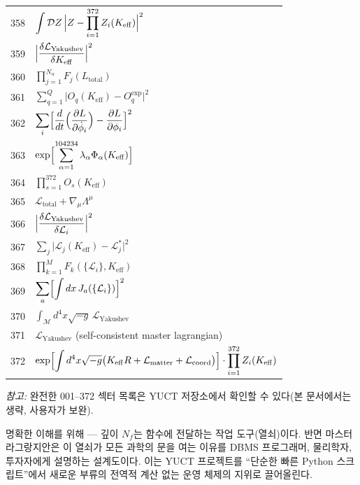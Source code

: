 \documentclass[11pt,a4paper]{article}
\begin{document}
\begin{longtable}{r p{}}
	358 & \(\displaystyle \int\mathcal{D}Z\,\Bigl|Z - \prod_{i=1}^{372}Z_i(K_{\mathrm{eff}})\Bigr|^2\) \\
	359 & \(\displaystyle \Bigl|\frac{\delta\mathcal{L}_{\text{Yakushev}}}{\delta K_{\mathrm{eff}}}\Bigr|^2\) \\
	360 & \(\displaystyle \prod_{j=1}^{N_\alpha}F_j(L_{\text{total}})\) \\
	361 & \(\displaystyle \sum_{q=1}^Q\bigl|O_q(K_{\mathrm{eff}}) - O_q^{\text{exp}}\bigr|^2\) \\
	362 & \(\displaystyle \sum_i\Bigl[\frac{d}{dt}\Bigl(\frac{\partial L}{\partial\dot\phi_i}\Bigr) - \frac{\partial L}{\partial\phi_i}\Bigr]^2\) \\
	363 & \(\displaystyle \exp\Bigl[\sum_{\alpha=1}^{104234}\lambda_\alpha\Phi_\alpha(K_{\mathrm{eff}})\Bigr]\) \\
	364 & \(\displaystyle \prod_{s=1}^{372}O_s(K_{\mathrm{eff}})\) \\
	365 & \(\displaystyle \mathcal{L}_{\text{total}} + \nabla_\mu\Lambda^\mu\) \\
	366 & \(\displaystyle \Bigl|\frac{\delta\mathcal{L}_{\text{Yakushev}}}{\delta\mathcal{L}_i}\Bigr|^2\) \\
	367 & \(\displaystyle \sum_j\bigl|\mathcal{L}_j(K_{\mathrm{eff}}) - \mathcal{L}_j^*\bigr|^2\) \\
	368 & \(\displaystyle \prod_{k=1}^M F_k(\{\mathcal{L}_i\},K_{\mathrm{eff}})\) \\
	369 & \(\displaystyle \sum_a\Bigl[\int dx\,J_a(\{\mathcal{L}_i\})\Bigr]^2\) \\
	370 & \(\displaystyle \int_{\mathcal{M}} d^4x\sqrt{-g}\,\mathcal{L}_{\text{Yakushev}}\) \\
	371 & \(\displaystyle \mathcal{L}_{\text{Yakushev}}\) (self-consistent master lagrangian) \\
	372 & \(\displaystyle \exp\Bigl[\int d^4x\sqrt{-g}\bigl(K_{\mathrm{eff}}R + \mathcal{L}_{\text{matter}} + \mathcal{L}_{\text{coord}}\bigr)\Bigr]\cdot\prod_{i=1}^{372}Z_i(K_{\mathrm{eff}})\) \\
	
\end{longtable}
	
	\textit{참고:} 완전한 001–372 섹터 목록은 YUCT 저장소에서 확인할 수 있다(본 문서에서는 생략, 사용자가 보완).
	
	\small
	명확한 이해를 위해 — 깊이 \(N_{f}\)는 함수에 전달하는 작업 도구(열쇠)이다. 반면 마스터 라그랑지안은 이 열쇠가 모든 과학의 문을 여는 이유를 DBMS 프로그래머, 물리학자, 투자자에게 설명하는 설계도이다. 이는 YUCT 프로젝트를 “단순한 빠른 Python 스크립트”에서 새로운 부류의 전역적 계산 없는 운영 체제의 지위로 끌어올린다.
	
\end{document}
